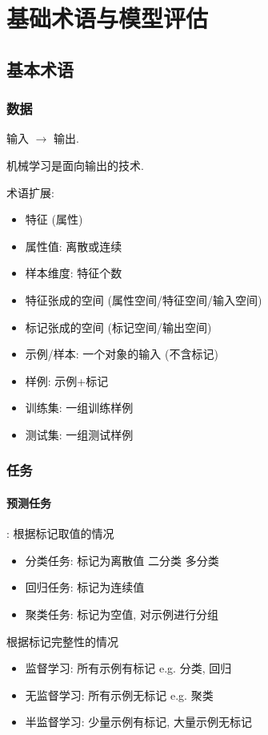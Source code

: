 \newpage
\section{基础术语与模型评估}

\subsection{基本术语}
\subsubsection{数据}
输入 $\to$ 输出. 

机械学习是面向输出的技术. 

术语扩展:
\begin{itemize}
    \item 特征 (属性)
    \item 属性值: 离散或连续
    \item 样本维度: 特征个数
    \item 特征张成的空间 (属性空间/特征空间/输入空间)
    \item 标记张成的空间 (标记空间/输出空间)
    \item 示例/样本: 一个对象的输入 (不含标记)
    \item 样例: 示例+标记
    \item 训练集: 一组训练样例
    \item 测试集: 一组测试样例
\end{itemize}

\subsubsection{任务}
\paragraph{预测任务}: 根据标记取值的情况
\begin{itemize}
    \item 分类任务: 标记为离散值
    \subitem 二分类
    \subitem 多分类
    \item 回归任务: 标记为连续值
    \item 聚类任务: 标记为空值, 对示例进行分组
\end{itemize}
根据标记完整性的情况
\begin{itemize}
    \item 监督学习: 所有示例有标记
    \subitem e.g. 分类, 回归
    \item 无监督学习: 所有示例无标记
    \subitem e.g. 聚类
    \item 半监督学习: 少量示例有标记, 大量示例无标记
\end{itemize}

